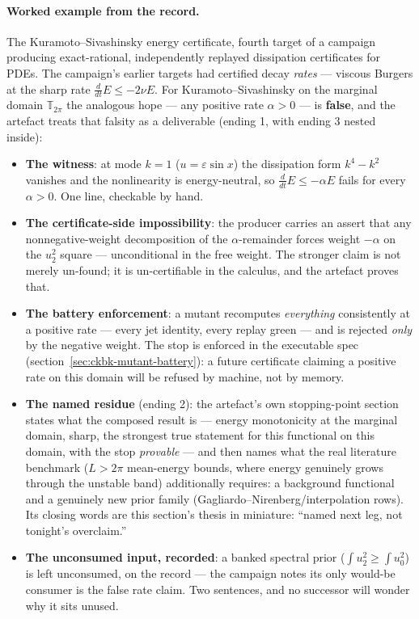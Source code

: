\paragraph{Worked example from the record.} The Kuramoto--Sivashinsky
energy certificate, fourth target of a campaign producing
exact-rational, independently replayed dissipation certificates for
PDEs. The campaign's earlier targets had certified decay \emph{rates}
--- viscous Burgers at the sharp rate
$\tfrac{d}{dt}E \le -2\nu E$. For Kuramoto--Sivashinsky on the marginal
domain $\mathbb{T}_{2\pi}$ the analogous hope --- any positive rate
$\alpha > 0$ --- is \textbf{false}, and the artefact treats that
falsity as a deliverable (ending 1, with ending 3 nested inside):

\begin{itemize}
\item \textbf{The witness}: at mode $k = 1$ ($u = \varepsilon\sin x$)
  the dissipation form $k^4 - k^2$ vanishes and the nonlinearity is
  energy-neutral, so $\tfrac{d}{dt}E \le -\alpha E$ fails for every
  $\alpha > 0$. One line, checkable by hand.
\item \textbf{The certificate-side impossibility}: the producer carries
  an assert that any nonnegative-weight decomposition of the
  $\alpha$-remainder forces weight $-\alpha$ on the $u_2^2$ square ---
  unconditional in the free weight. The stronger claim is not merely
  un-found; it is un-certifiable in the calculus, and the artefact
  proves that.
\item \textbf{The battery enforcement}: a mutant recomputes
  \emph{everything} consistently at a positive rate --- every jet
  identity, every replay green --- and is rejected \emph{only} by the
  negative weight. The stop is enforced in the executable spec
  (section~\ref{sec:ckbk-mutant-battery}): a future certificate
  claiming a positive rate on this domain will be refused by machine,
  not by memory.
\item \textbf{The named residue} (ending 2): the artefact's own
  stopping-point section states what the composed result is ---
  energy monotonicity at the marginal domain, sharp, the strongest true
  statement for this functional on this domain, with the stop
  \emph{provable} --- and then names what the real literature benchmark
  ($L > 2\pi$ mean-energy bounds, where energy genuinely grows through
  the unstable band) additionally requires: a background functional and
  a genuinely new prior family (Gagliardo--Nirenberg/interpolation
  rows). Its closing words are this section's thesis in miniature:
  ``named next leg, not tonight's overclaim.''
\item \textbf{The unconsumed input, recorded}: a banked spectral prior
  ($\int u_2^2 \ge \int u_0^2$) is left unconsumed, on the record ---
  the campaign notes its only would-be consumer is the false rate
  claim. Two sentences, and no successor will wonder why it sits
  unused.
\end{itemize}

